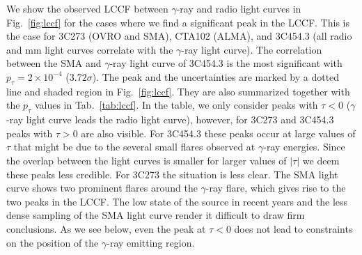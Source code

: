 \documentclass[twocolumn,linenumbers]{aastex62}
\newcommand{\gray}{$\gamma$-ray\xspace}
\begin{document}
We show the observed LCCF between \gray and radio light curves in Fig.~\ref{fig:lccf} for the cases where we find a significant peak in the LCCF. This is the case for 3C273 (OVRO and SMA), CTA102 (ALMA), and 3C454.3 (all radio and mm light curves correlate with the \gray light curve).
The correlation between the SMA and \gray light curve of 3C454.3 is the most significant with $p_\tau = 2\times10^{-4}$ ($3.72\sigma$). 
The peak and the uncertainties are marked by a dotted line and shaded region in Fig.~\ref{fig:lccf}.
They are also summarized together with the $p_\tau$ values in Tab.~\ref{tab:lccf}.
In the table, we only consider peaks with $\tau < 0$ (\gray light curve leads the radio light curve), however, 
for 3C273 and 3C454.3 peaks with $\tau > 0$ are also visible. 
For 3C454.3 these peaks occur at large values of $\tau$ that might be due to the several small flares observed at \gray energies. Since the overlap between the light curves is smaller for larger values of $|\tau|$ we deem these peaks less credible. 
For 3C273 the situation is less clear. 
The SMA light curve shows two prominent flares around the 
\gray flare, which gives rise to the two peaks in the LCCF. 
The low state of the source in recent years and the less dense sampling of the SMA light curve render it difficult to draw firm conclusions. As we see below, even the peak at $\tau < 0$ does not lead to constraints on the position of the \gray emitting region.
\end{document}
